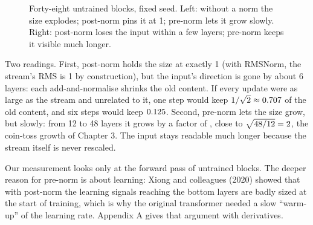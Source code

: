 \begin{figure}[h]
\centering
{}
\caption{Forty-eight untrained blocks, fixed seed. Left: without a norm the size explodes; post-norm pins it at 1;
pre-norm lets it grow slowly. Right: post-norm loses the input within a few layers; pre-norm keeps it visible
much longer.}
\end{figure}

Two readings. First, post-norm holds the size at exactly 1 (with RMSNorm, the stream's RMS is 1 by construction),
but the input's direction is gone by about 6 layers: each add-and-normalise shrinks the old content. If every
update were as large as the stream and unrelated to it, one step would keep $1/\sqrt2\approx0.707$ of the
old content, and six steps would keep $0.125$. Second, pre-norm lets the size grow, but slowly: from 12
to 48 layers it grows by a factor of \nSixPreRatio, close to $\sqrt{48/12}=2$, the coin-toss growth of
Chapter 3. The input stays readable much longer because the stream itself is never rescaled.

\begin{breaks}
Our measurement looks only at the forward pass of untrained blocks. The deeper reason for pre-norm is about
learning: Xiong and colleagues (2020) showed that with post-norm the learning signals reaching the bottom layers
are badly sized at the start of training, which is why the original transformer needed a slow ``warm-up'' of the
learning rate. Appendix A gives that argument with derivatives.
\end{breaks}

